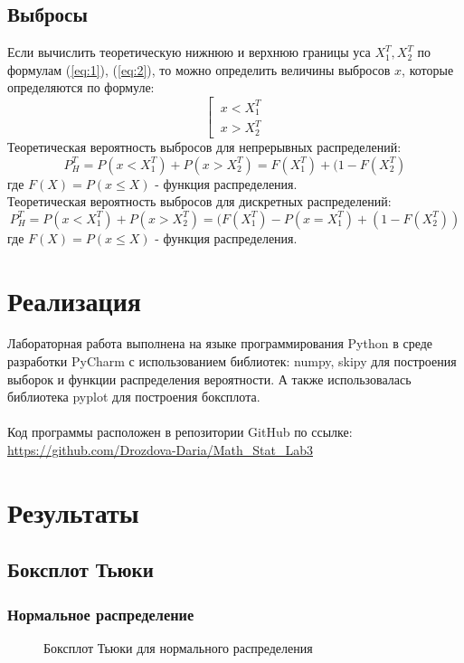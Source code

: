 \documentclass{article}
\begin{document}
\subsection{Выбросы}
Если вычислить теоретическую нижнюю и верхнюю границы уса $X_1^T, X_2^T$ по формулам (\ref{eq:1}), (\ref{eq:2}), то можно определить величины выбросов $x$, которые определяются по формуле:
\begin{equation}
  \left[\ 
  \begin{array}{rcl}
  x < X_1^T \\
  x > X_2^T
  \end{array}\right.
  \label{eq:3}
\end{equation}
Теоретическая вероятность выбросов для непрерывных распределений:
\begin{equation}
P_H^T = P(x < X_1^T) + P(x > X_2^T) = F(X_1^T) + (1 - F(X_2^T)
\label{eq:4}
\end{equation}
где $F(X)=P(x \le X)$ - функция распределения. \\
Теоретическая вероятность выбросов для дискретных распределений:
\begin{equation}
P_H^T = P(x < X_1^T) + P(x > X_2^T) = (F(X_1^T) - P(x = X_1^T) + (1 - F(X_2^T))
\label{eq:5}
\end{equation}
где $F(X)=P(x \le X)$ - функция распределения.

\newpage
\section{Реализация}
Лабораторная работа выполнена на языке программирования Python в среде разработки PyCharm с использованием библиотек: numpy, skipy для построения выборок и функции распределения вероятности. А также использовалась библиотека pyplot для построения боксплота.
\\
\\
Код программы расположен в репозитории GitHub по ссылке: \url{https://github.com/Drozdova-Daria/Math_Stat_Lab3}

\newpage
\section{Результаты}
\subsection{Боксплот Тьюки}
\subsubsection{Нормальное распределение}
\begin{figure}[h]
\caption{Боксплот Тьюки для нормального распределения}
\end{figure}
\end{document}
